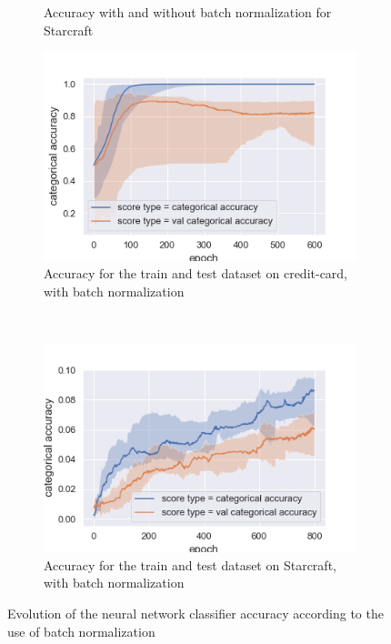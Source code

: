 \documentclass[10pt]{article}
\begin{document}
\begin{figure}
\begin{subfigure}[]{0.45\columnwidth}
				\caption{Accuracy with and without batch normalization for Starcraft}
				\label{per_sc_bn}
			\end{subfigure}
			\begin{subfigure}[]{0.45\columnwidth}
				\centering \includegraphics[width=\linewidth]{../graphics/per_creditcard_epoch_score_type_score_type.png}
				\caption{Accuracy for the train and test dataset on credit-card, with batch normalization}
				\label{per_cc_train_vs_test_bn}
			\end{subfigure}~
				\begin{subfigure}[]{0.45\columnwidth}
				\centering
				\includegraphics[width=\linewidth]{../graphics/per_starcraft_epoch_score_type_score_type.png}
				\caption{Accuracy for the train and test dataset on Starcraft, with batch normalization}
			\label{per_sc_train_vs_test_bn}
		\end{subfigure}
		\caption{Evolution of the neural network classifier accuracy according to the use of batch normalization}
		\label{per_bn}
		\end{figure}
\end{document}
